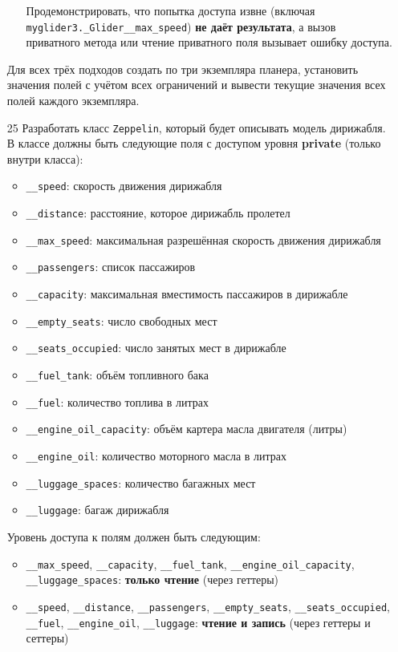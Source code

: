 \begin{enumerate}
\begin{enumerate}
    Продемонстрировать, что попытка доступа извне (включая \texttt{myglider3.\_Glider\_\_max\_speed}) \textbf{не даёт результата}, а вызов приватного метода или чтение приватного поля вызывает ошибку доступа.
\end{enumerate}
Для всех трёх подходов создать по три экземпляра планера, установить значения полей с учётом всех ограничений и вывести текущие значения всех полей каждого экземпляра.
\item[25] Разработать класс \texttt{Zeppelin}, который будет описывать модель дирижабля. В классе должны быть следующие поля с доступом уровня \textbf{private} (только внутри класса):
\begin{itemize}
    \item \texttt{\_\_speed}: скорость движения дирижабля  
    \item \texttt{\_\_distance}: расстояние, которое дирижабль пролетел  
    \item \texttt{\_\_max\_speed}: максимальная разрешённая скорость движения дирижабля  
    \item \texttt{\_\_passengers}: список пассажиров  
    \item \texttt{\_\_capacity}: максимальная вместимость пассажиров в дирижабле  
    \item \texttt{\_\_empty\_seats}: число свободных мест  
    \item \texttt{\_\_seats\_occupied}: число занятых мест в дирижабле  
    \item \texttt{\_\_fuel\_tank}: объём топливного бака  
    \item \texttt{\_\_fuel}: количество топлива в литрах  
    \item \texttt{\_\_engine\_oil\_capacity}: объём картера масла двигателя (литры)  
    \item \texttt{\_\_engine\_oil}: количество моторного масла в литрах  
    \item \texttt{\_\_luggage\_spaces}: количество багажных мест  
    \item \texttt{\_\_luggage}: багаж дирижабля  
\end{itemize}
Уровень доступа к полям должен быть следующим:
\begin{itemize}
    \item \texttt{\_\_max\_speed}, \texttt{\_\_capacity}, \texttt{\_\_fuel\_tank}, \texttt{\_\_engine\_oil\_capacity}, \texttt{\_\_luggage\_spaces}: \textbf{только чтение} (через геттеры)  
    \item \texttt{\_\_speed}, \texttt{\_\_distance}, \texttt{\_\_passengers}, \texttt{\_\_empty\_seats}, \texttt{\_\_seats\_occupied}, \texttt{\_\_fuel}, \texttt{\_\_engine\_oil}, \texttt{\_\_luggage}: \textbf{чтение и запись} (через геттеры и сеттеры)

\end{itemize}
\end{enumerate}
